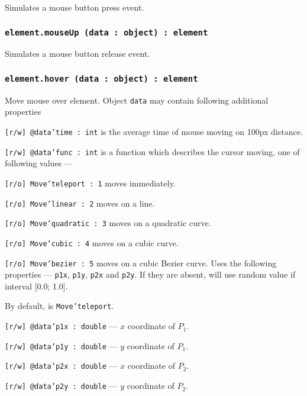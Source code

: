 Simulates a mouse button press event.

\subsubsection{\texttt{element.mouseUp (data : object) : element}}

Simulates a mouse button release event.

\subsubsection{\texttt{element.hover (data : object) : element}}

Move mouse over element. Object \texttt{data} may contain following additional properties
\begin{icItems}
	\item \texttt{[r/w] @data'time : int} is the average time of mouse moving on 100px distance.
	\item \texttt{[r/w] @data'func : int} is a function which describes the cursor moving, one of following values —
	\begin{icItems}
		\item \texttt{[r/o] Move'teleport : 1} moves immediately.
		\item \texttt{[r/o] Move'linear : 2} moves on a line.
		\item \texttt{[r/o] Move'quadratic : 3} moves on a quadratic curve.
		\item \texttt{[r/o] Move'cubic : 4} moves on a cubic curve.
		\item \texttt{[r/o] Move'bezier : 5} moves on a cubic Bezier curve. Uses the following properties — \texttt{p1x}, \texttt{p1y}, \texttt{p2x} and \texttt{p2y}. If they are absent, will use random value if interval [0.0; 1.0].
	\end{icItems}
	By default, is \texttt{Move'teleport}.
	\item \texttt{[r/w] @data'p1x : double} — $x$ coordinate of $P_1$.
	\item \texttt{[r/w] @data'p1y : double} — $y$ coordinate of $P_1$.
	\item \texttt{[r/w] @data'p2x : double} — $x$ coordinate of $P_2$.
	\item \texttt{[r/w] @data'p2y : double} — $y$ coordinate of $P_2$.
\end{icItems}

